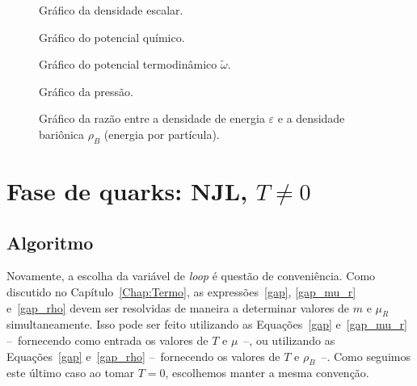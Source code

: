 \begin{figure}
	
	\caption{Gráfico da densidade escalar. \protect}
	\label{Fig:scalar_density_NJL-D_1}
\end{figure}

\begin{figure}
	
	\caption{Gráfico do potencial químico. \protect}
	\label{Fig:chemical_potential_NJL-D_1}
\end{figure}

\begin{figure}
	
	\caption{Gráfico do potencial termodinâmico $\tilde{\omega}$. \protect}
	\label{Fig:thermodynamic_potential_NJL-D_1}
\end{figure}

\begin{figure}
	
	\caption{Gráfico da pressão. \protect}
	\label{Fig:pressure_NJL-D_1}
\end{figure}

\begin{figure}
	
	\caption{Gráfico da razão entre a densidade de energia $\varepsilon$ e a densidade bariônica $\rho_B$ (energia por partícula). \protect}
	\label{Fig:energy_density_per_particle_NJL-D_1}
\end{figure}

\FloatBarrier

\section{Fase de quarks: NJL, $T \neq 0$}

\subsection{Algoritmo}

Novamente, a escolha da variável de \emph{loop} é questão de conveniência. Como discutido no Capítulo~\ref{Chap:Termo}, as expressões~\eqref{gap}, \eqref{gap_mu_r} e~\eqref{gap_rho} devem ser resolvidas de maneira a determinar valores de $m$ e $\mu_R$ simultaneamente. Isso pode ser feito utilizando as Equações~\eqref{gap} e~\eqref{gap_mu_r} --~fornecendo como entrada os valores de $T$ e $\mu$~--, ou utilizando as Equações~\eqref{gap} e~\eqref{gap_rho} --~fornecendo os valores de $T$ e $\rho_B$~--. Como seguimos este último caso ao tomar $T = 0$, escolhemos manter a mesma convenção.


